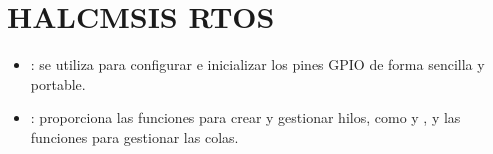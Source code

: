 \documentclass[letterpaper,10pt,english]{sphinxmanual}
\begin{document}
\section{HAL\sphinxhyphen{}CMSIS RTOS}
\label{\detokenize{ejemplothreads-queues:hal-cmsis-rtos}}\begin{itemize}
\item {} 
\sphinxAtStartPar
{}: se utiliza para configurar e inicializar los pines GPIO de forma sencilla y portable.

\item {} 
\sphinxAtStartPar
{}: proporciona las funciones para crear y gestionar hilos, como  y , y las funciones para gestionar las colas.

\end{itemize}
\end{document}
